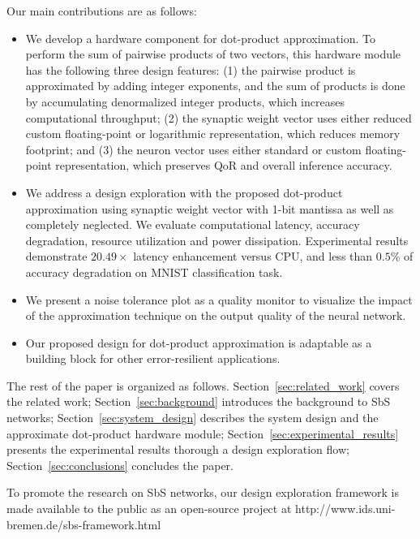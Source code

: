 Our main contributions are as follows:

\begin{itemize}
	\item We develop a hardware component for dot-product approximation. To perform the sum of pairwise products of two vectors, this hardware module has the following three design features: (1) the pairwise product is approximated by adding integer exponents, and the sum of products is done by accumulating denormalized integer products, which increases computational throughput; (2) the synaptic weight vector uses either reduced custom floating-point or logarithmic representation, which reduces memory footprint; and (3) the neuron vector uses either standard or custom floating-point representation, which preserves QoR and overall inference accuracy.
	\item We address a design exploration with the proposed dot-product approximation using synaptic weight vector with 1-bit mantissa as well as completely neglected. We evaluate computational latency, accuracy degradation, resource utilization and power dissipation. Experimental results demonstrate $20.49\times$ latency enhancement versus CPU, and less than $0.5\%$ of accuracy degradation on MNIST classification task.
	\item We present a noise tolerance plot as a quality monitor to visualize the impact of the approximation technique on the output quality of the neural network.
	\item Our proposed design for dot-product approximation is adaptable as a building block for other error-resilient applications.
\end{itemize}


The rest of the paper is organized as follows. Section~\ref{sec:related_work} covers the related work; Section~\ref{sec:background} introduces the background to SbS networks; Section~\ref{sec:system_design} describes the system design and the approximate dot-product hardware module; Section~\ref{sec:experimental_results} presents the experimental results thorough a design exploration flow; Section~\ref{sec:conclusions} concludes the paper.


To promote the research on SbS networks, our design exploration framework is made available to the public as an open-source project at http://www.ids.uni-bremen.de/sbs-framework.html

